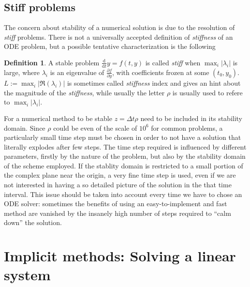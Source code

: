 \documentclass[a4paper,11pt ]{report}
\theoremstyle{definition}
\newtheorem{definition}{Definition}
\begin{document}
\subsection{Stiff problems}
The concern about stability of a numerical solution is due to the resolution of \textit{stiff} problems. There is not a universally accepted definition of \textit{stiffness} of an ODE problem, but a possible tentative characterization is the following
\theoremstyle{definition}
\begin{definition}{}
A stable problem $\frac{\text{d}}{\text{d} t}y = f(t,y)$ is called \textit{stiff} when $\max_{i}\vert \lambda_i \vert$ is large, where $\lambda_i$ is an eigenvalue of $\frac{\partial f}{\partial y}$, with coefficients frozen at some $(t_0,y_0)$. $L:=\max_i\vert \Re(\lambda_i) \vert$ is sometimes called \textit{stiffness} index and gives an hint about the magnitude of the \textit{stiffness}, while usually the letter $\rho$ is usually used to refere to $\max_{i}\vert \lambda_i \vert$.
\end{definition}{}
For a numerical method to be stable $z=\Delta t \rho$ need to be included in its stability domain. Since $\rho$ could be even of the scale of $10^6$ for common problems, a particularly small time step must be chosen in order to not have a solution that literally explodes after few steps. The time step required is influenced by different parameters, firstly by the nature of the problem, but also by the stability domain of the scheme employed. If the stablity domain is restricted to a small portion of the complex plane  near the origin, a very fine time step is used, even if we are not interested in having a so detailed picture of the solution in the that time interval. This issue should be taken into account every time we have to chose an ODE solver: sometimes the benefits of using an easy-to-implement and fast method are vanished by the insanely high number of steps required to \enquote{calm down} the solution. 

\section{Implicit methods: Solving a linear system}
\end{document}
